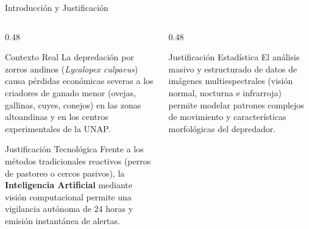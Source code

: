 \documentclass[10pt,aspectratio=169]{beamer}
\begin{document}
\begin{frame}{Introducción y Justificación}
  \begin{columns}[T]
    \begin{column}{0.48\textwidth}
      \begin{block}{Contexto Real}
        \small
        La depredación por zorros andinos (\textit{Lycalopex culpaeus}) causa pérdidas económicas severas a los criadores de ganado menor (ovejas, gallinas, cuyes, conejos) en las zonas altoandinas y en los centros experimentales de la UNAP.
      \end{block}
      \vspace{0.2cm}
      \begin{block}{Justificación Tecnológica}
        \small
        Frente a los métodos tradicionales reactivos (perros de pastoreo o cercos pasivos), la \textbf{Inteligencia Artificial} mediante visión computacional permite una vigilancia autónoma de 24 horas y emisión instantánea de alertas.
      \end{block}
    \end{column}
    
    \begin{column}{0.48\textwidth}
      \begin{block}{Justificación Estadística}
        \small
        El análisis masivo y estructurado de datos de imágenes multiespectrales (visión normal, nocturna e infrarroja) permite modelar patrones complejos de movimiento y características morfológicas del depredador.
      \end{block}
      \vspace{0.3cm}
      \centering
    \end{column}
  \end{columns}
\end{frame}
\end{document}
